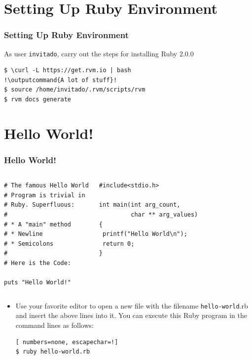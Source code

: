 \documentclass{beamer}
\newcommand{\outputcommand}[1]{\color{darkgreen}{#1}}
\begin{document}
\section{Setting Up Ruby Environment}
\begin{frame}[fragile]
\frametitle{Setting Up Ruby Environment}
As user \texttt{invitado}, carry out the steps for installing Ruby 2.0.0

\lstset{language=shell}
\begin{lstlisting}[numbers=none, escapechar=!]
$ \curl -L https://get.rvm.io | bash
!\outputcommand{A lot of stuff}!
$ source /home/invitado/.rvm/scripts/rvm
$ rvm docs generate
\end{lstlisting}

\end{frame}
\section{Hello World!}
\begin{frame}[fragile]
\frametitle{Hello World!}
\begin{columns}
\lstset{language=Ruby, style=eclipse}
\begin{lstlisting}[escapechar=!]
# The famous Hello World
# Program is trivial in
# Ruby. Superfluous:
#
# * A "main" method
# * Newline
# * Semicolons
#
# Here is the Code:

puts "Hello World!"
\end{lstlisting}
\lstset{language=C, style=eclipse}
\begin{lstlisting}[escapechar=!]
#include<stdio.h>

int main(int arg_count,
         char ** arg_values)
{
 printf("Hello World\n");
 return 0;
}
\end{lstlisting}
\end{columns}
\begin{itemize}
 \item Use your favorite editor to open a new file with the filename \texttt{hello-world}.rb and insert the above lines into it. You can execute this Ruby program in the command lines as follows:

\lstset{language=shell}
\begin{lstlisting}[ numbers=none, escapechar=!]
$ ruby hello-world.rb
\end{lstlisting}
\end{itemize}



\end{frame}
\end{document}

